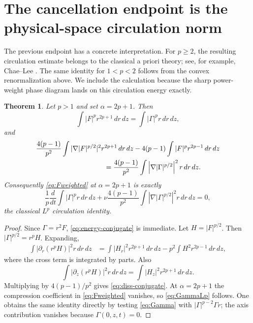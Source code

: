 \documentclass[11pt]{article}
\numberwithin{equation}{section}
\newtheorem{theorem}{Theorem}[section]
\theoremstyle{remark}
\begin{document}
\section{The cancellation endpoint is the physical-space circulation norm}

The previous endpoint has a concrete interpretation.  For \(p\ge2\), the resulting circulation estimate belongs to the classical a priori theory; see, for example, Chae--Lee \cite{ChaeLee2002}.  The same identity for \(1<p<2\) follows from the convex renormalization above.  We include the calculation because the sharp power-weight phase diagram lands on this circulation energy exactly.

\begin{theorem}\label{thm:circulationendpoint}
Let \(p>1\) and set \(\alpha=2p+1\).  Then
\begin{equation}\label{eq:energy-conjugate}
 \int |F|^p r^{2p+1}\,dr\,dz
 =\int |\Gamma|^p r\,dr\,dz,
\end{equation}
and
\begin{align}
 &\frac{4(p-1)}{p^2}\int|\nabla |F|^{p/2}|^2r^{2p+1}\,dr\,dz
 -4(p-1)\int |F|^p r^{2p-1}\,dr\,dz\nonumber\\
 &\hspace{35mm}=\frac{4(p-1)}{p^2}
 \int\left|\nabla |\Gamma|^{p/2}\right|^2r\,dr\,dz.
 \label{eq:diss-conjugate}
\end{align}
Consequently \eqref{eq:Fweighted} at \(\alpha=2p+1\) is exactly
\begin{equation}\label{eq:GammaLp}
 \frac1p\frac d{dt}\int|\Gamma|^p r\,dr\,dz
 +\nu\frac{4(p-1)}{p^2}
 \int\left|\nabla|\Gamma|^{p/2}\right|^2r\,dr\,dz=0,
\end{equation}
the classical \(L^p\) circulation identity.
\end{theorem}

\begin{proof}
Since \(\Gamma=r^2F\), \eqref{eq:energy-conjugate} is immediate.  Let \(H=|F|^{p/2}\).  Then \(|\Gamma|^{p/2}=r^pH\).  Expanding,
\begin{align*}
 \int \left|\partial_r(r^pH)\right|^2r\,dr\,dz
 &=\int |H_r|^2r^{2p+1}\,dr\,dz
 -p^2\int H^2r^{2p-1}\,dr\,dz,
\end{align*}
where the cross term is integrated by parts.  Also
\[
 \int \left|\partial_z(r^pH)\right|^2r\,dr\,dz
 =\int |H_z|^2r^{2p+1}\,dr\,dz.
\]
Multiplying by \(4(p-1)/p^2\) gives \eqref{eq:diss-conjugate}.  At \(\alpha=2p+1\) the compression coefficient in \eqref{eq:Fweighted} vanishes, so \eqref{eq:GammaLp} follows.  One obtains the same identity directly by testing \eqref{eq:Gamma} with \(|\Gamma|^{p-2}\Gamma r\); the axis contribution vanishes because \(\Gamma(0,z,t)=0\).
\end{proof}
\end{document}

